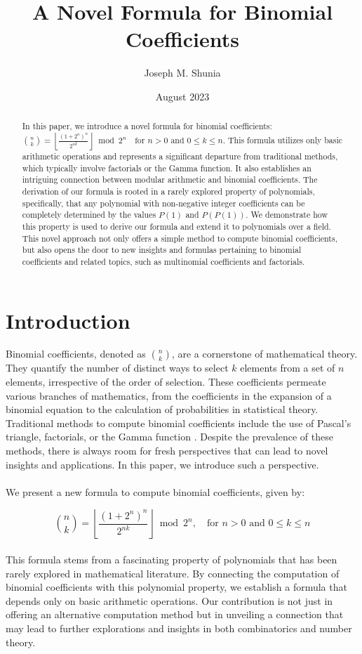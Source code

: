 \documentclass{article}
\title{A Novel Formula for Binomial Coefficients}
\author{Joseph M. Shunia}
\date{August 2023}
\theoremstyle{plain}
\begin{document}
\maketitle

\begin{abstract}
In this paper, we introduce a novel formula for binomial coefficients: \(\binom{n}{k} = \left\lfloor\frac{(1 + 2^{n})^{n}}{2^{n k}}\right\rfloor \bmod{2^{n}} \quad \text{for } n > 0 \text{ and } 0 \leq k \leq n\). This formula utilizes only basic arithmetic operations and represents a significant departure from traditional methods, which typically involve factorials or the Gamma function. It also establishes an intriguing connection between modular arithmetic and binomial coefficients. The derivation of our formula is rooted in a rarely explored property of polynomials, specifically, that any polynomial with non-negative integer coefficients can be completely determined by the values \(P(1)\) and \(P(P(1))\). We demonstrate how this property is used to derive our formula and extend it to polynomials over a field. This novel approach not only offers a simple method to compute binomial coefficients, but also opens the door to new insights and formulas pertaining to binomial coefficients and related topics, such as multinomial coefficients and factorials.
\end{abstract}

\section{Introduction}
Binomial coefficients, denoted as \(\binom{n}{k}\), are a cornerstone of mathematical theory. They quantify the number of distinct ways to select \(k\) elements from a set of \(n\) elements, irrespective of the order of selection. These coefficients permeate various branches of mathematics, from the coefficients in the expansion of a binomial equation to the calculation of probabilities in statistical theory. Traditional methods to compute binomial coefficients include the use of Pascal's triangle, factorials, or the Gamma function \cite{brualdi1992introductory}. Despite the prevalence of these methods, there is always room for fresh perspectives that can lead to novel insights and applications. In this paper, we introduce such a perspective.
\\
\\
We present a new formula to compute binomial coefficients, given by:

\begin{equation}
\binom{n}{k} = \left\lfloor\frac{(1 + 2^{n})^{n}}{2^{n k}}\right\rfloor \bmod{2^{n}}, \quad \text{for } n > 0 \text{ and } 0 \leq k \leq n
\end{equation}
\\
This formula stems from a fascinating property of polynomials that has been rarely explored in mathematical literature. By connecting the computation of binomial coefficients with this polynomial property, we establish a formula that depends only on basic arithmetic operations. Our contribution is not just in offering an alternative computation method but in unveiling a connection that may lead to further explorations and insights in both combinatorics and number theory.
\end{document}
